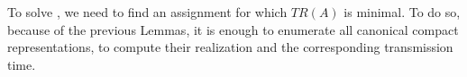 


To solve \spall, we need to find an assignment for which $TR(A)$ is minimal. 
To do so, because of the previous Lemmas, it is enough to 
enumerate all canonical compact representations, to compute their realization and the corresponding transmission time.




